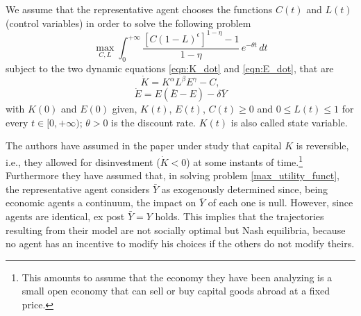 We assume that the representative agent chooses the functions $C(t)$ and $L(t)$ (control variables) in order to solve the following problem
\begin{equation} \label{max_utility_funct}
	\max_{C,L} \int_{0}^{+\infty} \frac{[C(1-L)^{\epsilon}]^{1-\eta} -1}{1-\eta}\, e^{-\theta t} \,dt 
\end{equation}
subject to the two dynamic equations \eqref{eqn:K_dot} and \eqref{eqn:E_dot}, that are
$$\dot{K} = K^\alpha L^\beta E^\gamma -C,$$
$$\dot{E} = E(\bar{E}-E)-\delta\bar{Y}$$ 
with $K(0)$ and $E(0)$ given, $K(t)$, $E(t)$, $C(t)\geq0$ and $0\leq L(t)\leq 1$ for every $t\in [0,+\infty)$; $\theta>0$ is the discount rate. $K(t)$ is also called state variable.

The authors have assumed in the paper under study that capital $K$ is reversible, i.e., they allowed for disinvestment ($\dot{K}<0$) at some instants of time.\footnote{This amounts to assume that the economy they have been analyzing is a small open economy that can sell or buy capital goods abroad at a fixed price.} Furthermore they have assumed that, in solving problem \eqref{max_utility_funct}, the representative agent considers $\bar{Y}$ as exogenously determined since, being economic agents a continuum, the impact on $\bar{Y}$ of each one is null. However, since agents are identical, ex post $\bar{Y} = Y$ holds. This implies that the trajectories resulting from their model are not socially optimal but Nash equilibria, because no agent has an incentive to modify his choices if the others do not modify theirs.

